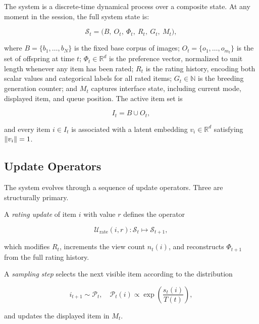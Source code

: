 \documentclass[12pt, a4paper]{article}
\DeclarePairedDelimiter{\norm}{\lVert}{\rVert}
\theoremstyle{definition}
\begin{document}
The system is a discrete-time dynamical process over a composite state. At any moment in the session, the full system state is:

\begin{equation}
\mathcal{S}_t = \bigl(B,\ O_t,\ \Phi_t,\ R_t,\ G_t,\ M_t\bigr),
\end{equation}

where $B = \{b_1, \dots, b_N\}$ is the fixed base corpus of images; $O_t = \{o_1, \dots, o_{m_t}\}$ is the set of offspring at time $t$; $\Phi_t \in \mathbb{R}^d$ is the preference vector, normalized to unit length whenever any item has been rated; $R_t$ is the rating history, encoding both scalar values and categorical labels for all rated items; $G_t \in \mathbb{N}$ is the breeding generation counter; and $M_t$ captures interface state, including current mode, displayed item, and queue position. The active item set is

\begin{equation}
I_t = B \cup O_t,
\end{equation}

and every item $i \in I_t$ is associated with a latent embedding $v_i \in \mathbb{R}^d$ satisfying $\norm{v_i} = 1$.

\subsection{Update Operators}

The system evolves through a sequence of update operators. Three are structurally primary.

A \textit{rating update} of item $i$ with value $r$ defines the operator

\begin{equation}
\mathcal{U}_{\text{rate}}(i, r) : \mathcal{S}_t \mapsto \mathcal{S}_{t+1},
\end{equation}

which modifies $R_t$, increments the view count $n_t(i)$, and reconstructs $\Phi_{t+1}$ from the full rating history.

A \textit{sampling step} selects the next visible item according to the distribution

\begin{equation}
i_{t+1} \sim \mathcal{P}_t,\quad \mathcal{P}_t(i) \propto \exp\!\left(\frac{s_t(i)}{T(t)}\right),
\end{equation}

and updates the displayed item in $M_t$.
\end{document}

